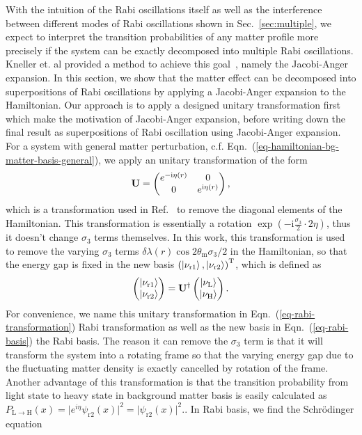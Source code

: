 With the intuition of the Rabi oscillations itself as well as the interference between different modes of Rabi oscillations shown in Sec.~\ref{sec:multiple}, we expect to interpret the transition probabilities of any matter profile more precisely if the system can be exactly decomposed into multiple Rabi oscillations. Kneller et. al provided a method to achieve this goal~\cite{Kneller2013}, namely the Jacobi-Anger expansion. In this section, we show that the matter effect can be decomposed into superpositions of Rabi oscillations by applying a Jacobi-Anger expansion to the Hamiltonian. Our approach is to apply a designed unitary transformation first which make the motivation of Jacobi-Anger expansion, before writing down the final result as superpositions of Rabi oscillation using Jacobi-Anger expansion. For a system with general matter perturbation, c.f. Eqn.~(\ref{eq-hamiltonian-bg-matter-basis-general}), we apply an unitary transformation of the form
\begin{equation}
    \mathbf{U} =  \begin{pmatrix} e^{-\ri \eta (r)} & 0 \\  0 & e^{\mathrm i \eta (r)}  \end{pmatrix},
    \label{eq-rabi-transformation}
\end{equation}
which is a transformation used in Ref.~\cite{Kneller2006} to remove the diagonal elements of the Hamiltonian. This transformation is essentially a rotation $\exp\left(-\mathrm i\frac{\sigma_3}{2}\cdot 2\eta\right)$, thus it doesn't change $
\sigma_3$ terms themselves. In this work, this transformation is used to remove the varying $\sigma_3$ terms $\delta\lambda(r) \cos 2\theta_{\mathrm m} \sigma_3/2$ in the Hamiltonian, so that the energy gap is fixed in the new basis $\left(\left| \nu_{\mathrm{r1}}\right\rangle,\left| \nu_{\mathrm{r2}}\right\rangle\right)^{\mathrm{T}}$, which is defined as
\begin{equation}
    \begin{pmatrix} \ket{\nu_{\mathrm{r1}}}\\ \ket{\nu_{\mathrm{r2}}} \end{pmatrix} =  \mathbf{U}^\dagger \begin{pmatrix} \ket{\nu_{\mathrm{L}}} \\ \ket{\nu_{\mathrm{H}}} \end{pmatrix}.
    \label{eq-rabi-basis}
\end{equation}
For convenience, we name this unitary transformation in Eqn.~(\ref{eq-rabi-transformation}) Rabi transformation as well as the new basis in Eqn.~(\ref{eq-rabi-basis}) the Rabi basis. The reason it can remove the $\sigma_3$ term is that it will transform the system into a rotating frame so that the varying energy gap due to the fluctuating matter density is exactly cancelled by rotation of the frame. Another advantage of this transformation is that the transition probability from light state to heavy state in background matter basis is easily calculated as $P_{\mathrm{L} \to
\mathrm{H}} (x) = \lvert e^{i\eta} \psi_{\mathrm r2} (x)  \rvert^2 = \lvert \psi_{\mathrm r2} (x)  \rvert^2 .$. In Rabi basis, we find the Schr\"{o}dinger equation
